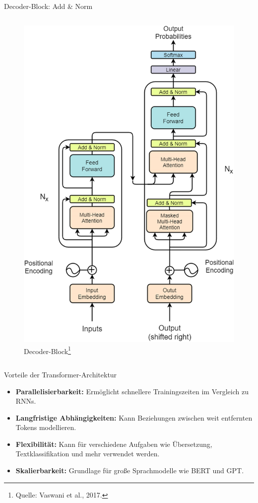 \documentclass[aspectratio=1610, xcolor=dvipsnames, 9pt]{beamer}
\begin{document}
\begin{frame}{Decoder-Block: Add \& Norm}
\begin{columns}
\begin{column}{0.3\textwidth}
\begin{figure}
        \includegraphics[width=0.9\columnwidth]{images/Transformer-architecture-figure-sourced-from-original-paper-26.png}
        \caption{Decoder-Block\footnote{Quelle: Vaswani et al., 2017.}}
      \end{figure}
    \end{column}
  \end{columns}
\end{frame}

\begin{frame}{Vorteile der Transformer-Architektur}
  \begin{itemize}
    \item \textbf{Parallelisierbarkeit:} Ermöglicht schnellere Trainingszeiten im Vergleich zu RNNs.
    \item \textbf{Langfristige Abhängigkeiten:} Kann Beziehungen zwischen weit entfernten Tokens modellieren.
    \item \textbf{Flexibilität:} Kann für verschiedene Aufgaben wie Übersetzung, Textklassifikation und mehr verwendet werden.
    \item \textbf{Skalierbarkeit:} Grundlage für große Sprachmodelle wie BERT und GPT.
  \end{itemize}
\end{frame}
\end{document}
